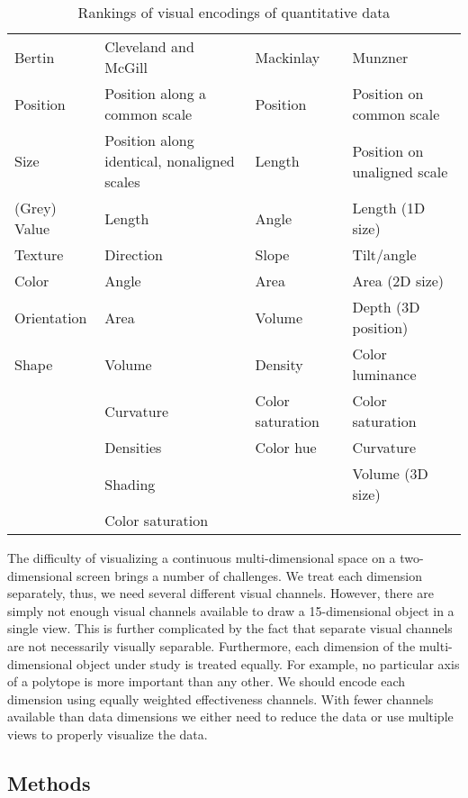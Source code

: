 \begin{table}
  \caption{Rankings of visual encodings of quantitative data}
  \label{tbl:visual_encodings}
  \begin{adjustbox}{max width=\linewidth}
  \begin{tabular}{llll}
    Bertin~\cite{Bertin:1967} & Cleveland and McGill~\cite{Cleveland:1984} & Mackinlay~\cite{Mackinlay:1986} & Munzner~\cite{Munzner:2014} \\
     Position & Position along a common scale & Position & Position on common scale \\
     Size & Position along identical, nonaligned scales & Length & Position on unaligned scale \\
     (Grey) Value & Length & Angle & Length (1D size) \\
     Texture & Direction & Slope & Tilt/angle \\
     Color & Angle & Area & Area (2D size) \\
     Orientation & Area & Volume & Depth (3D position) \\
     Shape & Volume & Density & Color luminance\\
     & Curvature & Color saturation & Color saturation \\
     & Densities & Color hue & Curvature \\
     & Shading & & Volume (3D size) \\
     & Color saturation &           & 
  \end{tabular}
  \end{adjustbox}
\end{table}

The difficulty of visualizing a continuous multi-dimensional space on a
two-dimensional screen brings a number of challenges. We treat each dimension
separately, thus, we need several different visual channels. However, there are
simply not enough visual channels available to draw a 15-dimensional object in
a single view. This is further complicated by the fact that separate visual
channels are not necessarily visually separable.  Furthermore, each dimension
of the multi-dimensional object under study is treated equally. For example, no
particular axis of a polytope is more important than any other.  We should
encode each dimension using equally weighted effectiveness channels.  With
fewer channels available than data dimensions we either need to reduce the data
or use multiple views to properly visualize the data.


\subsection{Methods}

